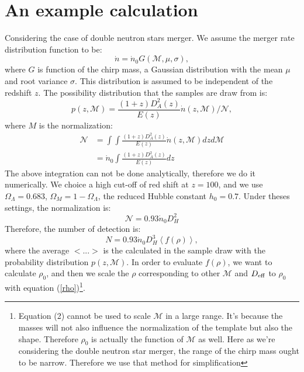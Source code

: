 \documentclass{article}
\begin{document}
\section{An example calculation}
Considering the case of double neutron stars merger. We assume the merger rate distribution function to be:
\begin{equation}
    \dot{n}=\dot{n}_0G(\mathcal{M},\mu,\sigma),
\end{equation}
where $G$ is function of the chirp mass, a Gaussian distribution with the mean $\mu$ and root variance $\sigma$. This distribution is assumed to be independent of the redshift $z$. The possibility distribution that the samples are draw from is:
\begin{equation}
    p(z,\mathcal{M})=\frac{(1+z)D^2_A(z)}{E(z)}\dot{n}(z,\mathcal{M})/\mathcal{N}, 
\end{equation}
where $M$ is the normalization: 
\begin{align}
    \mathcal{N}&=\int\int\frac{(1+z)D^2_A(z)}{E(z)}\dot{n}(z,\mathcal{M})dzd\mathcal{M}\\\nonumber
               &=\dot{n}_0\int\frac{(1+z)D^2_A(z)}{E(z)}dz
\end{align}
The above integration can not be done analytically, therefore we do it numerically.  We choice a high cut-off of red shift at $z=100$, and we use $\Omega_\Lambda=0.683$, $\Omega_M=1-\Omega_\Lambda$, the reduced Hubble constant $h_0=0.7$. Under theses settings, the normalization is:
\begin{equation}
    \mathcal{N}=0.93\dot{n}_0D^2_H
\end{equation}
Therefore, the number of detection is:
\begin{equation}
    N=0.93\dot{n}_0D_H^3\left<f(\rho)\right>,
\end{equation}
where the average $<...>$ is the calculated in the sample draw with the probability distribution $p(z,\mathcal{M})$. 
In order to evaluate $f(\rho)$, we want to calculate $\rho_0$, and then we scale the $\rho$ corresponding to other $\mathcal{M}$ and $D_{\rm{eff}}$ to $\rho_0$ with equation (\ref{rho})\footnote{Equation (2) cannot be used to scale $\mathcal{M}$ in a large range. It's because the masses will not also influence the normalization of the template but also the shape. Therefore $\rho_0$ is actually the function of $\mathcal{M}$ as well. Here as we're considering the double neutron star merger, the range of the chirp mass ought to be narrow. Therefore we use that method for simplification}. 
\end{document}
